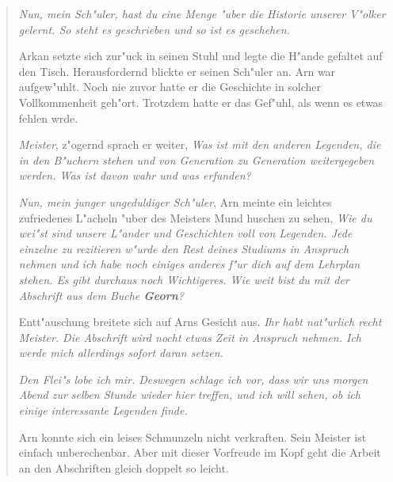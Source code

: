 \begin{quotation}
\par \textit{\glqq Nun, mein Sch"uler, hast du eine Menge "uber die Historie unserer V"olker gelernt. So steht es geschrieben und so ist es geschehen.\grqq}
\par Arkan setzte sich zur"uck in seinen Stuhl und legte die H"ande gefaltet auf den Tisch. Herausfordernd blickte er seinen Sch"uler an. Arn war aufgew"uhlt. Noch nie zuvor hatte er die Geschichte in solcher Vollkommenheit geh"ort. Trotzdem hatte er das Gef"uhl, als wenn es etwas fehlen wrde.
\par \textit{\glqq Meister\grqq}, z"ogernd sprach er weiter, \textit{\glqq Was ist mit den anderen Legenden, die in den B"uchern stehen und von Generation zu Generation weitergegeben werden. Was ist davon wahr und was erfunden?\grqq}
\par \textit{\glqq Nun, mein junger ungeduldiger Sch"uler\grqq}, Arn meinte ein leichtes zufriedenes L"acheln "uber des Meisters Mund huschen zu sehen, \textit{\glqq Wie du wei"st sind unsere L"ander und Geschichten voll von Legenden. Jede einzelne zu rezitieren w"urde den Rest deines Studiums in Anspruch nehmen und ich habe noch einiges anderes f"ur dich auf dem Lehrplan stehen. Es gibt durchaus noch Wichtigeres. Wie weit bist du mit der Abschrift aus dem Buche \textbf{Georn}?\grqq}
\par Entt"auschung breitete sich auf Arns Gesicht aus. \textit{\glqq Ihr habt nat"urlich recht Meister. Die Abschrift wird nocht etwas Zeit in Anspruch nehmen. Ich werde mich allerdings sofort daran setzen.\grqq}
\par \textit{\glqq Den Flei"s lobe ich mir. Deswegen schlage ich vor, dass wir uns morgen Abend zur selben Stunde wieder hier treffen, und ich will sehen, ob ich einige interessante Legenden finde.\grqq}
\par Arn konnte sich ein leises Schmunzeln nicht verkraften. Sein Meister ist einfach unberechenbar. Aber mit dieser Vorfreude im Kopf geht die Arbeit an den Abschriften gleich doppelt so leicht.

\end{quotation}







